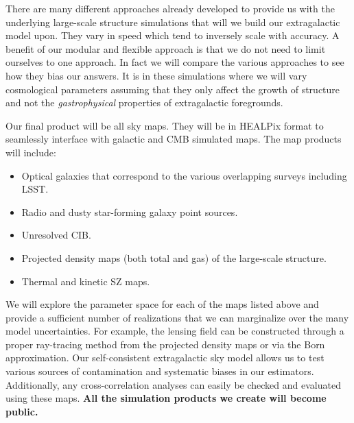There are many different approaches already developed to provide us with the underlying large-scale structure simulations that will we build our extragalactic model upon. They vary in speed which tend to inversely scale with accuracy. A benefit of our modular and flexible approach is that we do not need to limit ourselves to one approach. In fact we will compare the various approaches to see how they bias our answers. It is in these simulations where we will vary cosmological parameters assuming that they only affect the growth of structure and not the {\it gastrophysical} properties of extragalactic foregrounds.

Our final product will be all sky maps. They will be in HEALPix \cite{Gorski:2004by} format to seamlessly interface with galactic and CMB simulated maps. The map products will include:

\begin{itemize}
\item Optical galaxies that correspond to the various overlapping surveys including LSST.
\item Radio and dusty star-forming galaxy point sources.
\item Unresolved CIB.
\item Projected density maps (both total and gas) of the large-scale structure.
\item Thermal and kinetic SZ maps.
\end{itemize}

\noindent We will explore the parameter space for each of the maps listed above and provide a sufficient number of realizations that we can marginalize over the many model uncertainties. For example, the lensing field can be constructed through a proper ray-tracing method from the projected density maps or via the Born approximation. Our self-consistent extragalactic sky model allows us to test various sources of contamination and systematic biases in our estimators. Additionally, any cross-correlation analyses can easily be checked and evaluated using these maps. {\bf All the simulation products we create will become public.}
